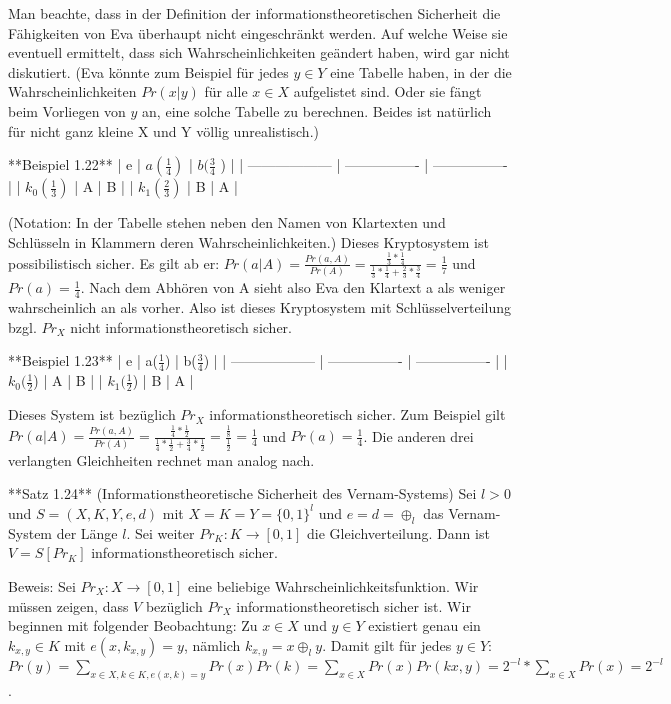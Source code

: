\documentclass[a4paper]{article}
\begin{document}
\begin{multicols}{3}
    Man beachte, dass in der Definition der informationstheoretischen Sicherheit die Fähigkeiten von Eva überhaupt nicht eingeschränkt werden. Auf welche Weise sie eventuell ermittelt, dass sich Wahrscheinlichkeiten geändert haben, wird gar nicht diskutiert. (Eva könnte zum Beispiel für jedes $y\in Y$ eine Tabelle haben, in der die Wahrscheinlichkeiten $Pr(x|y)$ für alle $x\in X$ aufgelistet sind. Oder sie fängt beim Vorliegen von $y$ an, eine solche Tabelle zu berechnen. Beides ist natürlich für nicht ganz kleine X und Y völlig unrealistisch.)

    **Beispiel 1.22**
    | e                  | $a(\frac{1}{4})$ | $b(\frac{3}{4}$ ) |
    | ------------------ | ---------------- | ---------------- |
    | $k_0(\frac{1}{3})$ | A                | B                |
    | $k_1(\frac{2}{3})$ | B                | A                |

    (Notation: In der Tabelle stehen neben den Namen von Klartexten und Schlüsseln in Klammern deren Wahrscheinlichkeiten.) Dieses Kryptosystem ist possibilistisch sicher. Es gilt ab er:
    $Pr(a|A)=\frac{Pr(a,A)}{Pr(A)}=\frac{\frac{1}{3}*\frac{1}{4}}{\frac{1}{3}*\frac{1}{4}+\frac{2}{3}*\frac{3}{4}}=\frac{1}{7}$ und $Pr(a)=\frac{1}{4}$.
    Nach dem Abhören von A sieht also Eva den Klartext a als weniger wahrscheinlich an als vorher. Also ist dieses Kryptosystem mit Schlüsselverteilung bzgl. $Pr_X$ nicht informationstheoretisch sicher.

    **Beispiel 1.23**
    | e                  | a($\frac{1}{4}$) | b($\frac{3}{4}$) |
    | ------------------ | ---------------- | ---------------- |
    | $k_0(\frac{1}{2}$) | A                | B                |
    | $k_1(\frac{1}{2}$) | B                | A                |

    Dieses System ist bezüglich $Pr_X$ informationstheoretisch sicher. Zum Beispiel gilt $Pr(a|A) =\frac{Pr(a,A)}{Pr(A)}=\frac{\frac{1}{4}*\frac{1}{2}}{\frac{1}{4}*\frac{1}{2}+\frac{3}{4}*\frac{1}{2}}=\frac{\frac{1}{8}}{\frac{1}{2}}=\frac{1}{4}$ und $Pr(a)=\frac{1}{4}$. Die anderen drei verlangten Gleichheiten rechnet man analog nach.

    **Satz 1.24** (Informationstheoretische Sicherheit des Vernam-Systems) Sei $l>0$ und $S=(X,K,Y,e,d)$ mit $X=K=Y=\{0,1\}^l$ und $e=d=\oplus_l$ das Vernam-System der Länge $l$. Sei weiter $Pr_K:K\rightarrow [0,1]$ die Gleichverteilung. Dann ist $V=S[Pr_K]$ informationstheoretisch sicher.

    Beweis: Sei $Pr_X:X\rightarrow [0,1]$ eine beliebige Wahrscheinlichkeitsfunktion. Wir müssen zeigen, dass $V$ bezüglich $Pr_X$ informationstheoretisch sicher ist. Wir beginnen mit folgender Beobachtung: Zu $x\in X$ und $y\in Y$  existiert genau ein $k_{x,y}\in K$ mit $e(x,k_{x,y})=y$, nämlich $k_{x,y}=x\oplus_l y$. Damit gilt für jedes $y\in Y$: $Pr(y)=\sum_{x\in X,k\in K,e(x,k)=y} Pr(x)Pr(k) = \sum_{x\in X} Pr(x) Pr(kx,y)= 2^{-l}* \sum_{x\in X} Pr(x)=2^{-l}$.


\end{multicols}
\end{document}
